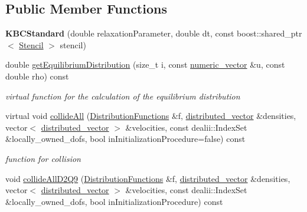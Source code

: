 \subsection*{Public Member Functions}
\begin{DoxyCompactItemize}
\item 
\hypertarget{classnatrium_1_1KBCStandard_ae775935dcbfcedc31364c5cb54031958}{
{\bfseries KBCStandard} (double relaxationParameter, double dt, const boost::shared\_\-ptr$<$ \hyperlink{classnatrium_1_1Stencil}{Stencil} $>$ stencil)}
\label{classnatrium_1_1KBCStandard_ae775935dcbfcedc31364c5cb54031958}

\item 
double \hyperlink{classnatrium_1_1KBCStandard_a1dac2deaafb93027bf168887dd2e002d}{getEquilibriumDistribution} (size\_\-t i, const \hyperlink{namespacenatrium_a67c39077adc6634f8fa3762b8eef24c4}{numeric\_\-vector} \&u, const double rho) const 
\begin{DoxyCompactList}\small\item\em virtual function for the calculation of the equilibrium distribution \item\end{DoxyCompactList}\item 
\hypertarget{classnatrium_1_1KBCStandard_ab27e055e44e1913a076235bc5a7f1f95}{
virtual void \hyperlink{classnatrium_1_1KBCStandard_ab27e055e44e1913a076235bc5a7f1f95}{collideAll} (\hyperlink{classnatrium_1_1DistributionFunctions}{DistributionFunctions} \&f, \hyperlink{namespacenatrium_a903d2b92917f582f2ff05f52160ab811}{distributed\_\-vector} \&densities, vector$<$ \hyperlink{namespacenatrium_a903d2b92917f582f2ff05f52160ab811}{distributed\_\-vector} $>$ \&velocities, const dealii::IndexSet \&locally\_\-owned\_\-dofs, bool inInitializationProcedure=false) const }
\label{classnatrium_1_1KBCStandard_ab27e055e44e1913a076235bc5a7f1f95}

\begin{DoxyCompactList}\small\item\em function for collision \item\end{DoxyCompactList}\item 
\hypertarget{classnatrium_1_1KBCStandard_a52be173f7289ef616099908c4ddb1316}{
void \hyperlink{classnatrium_1_1KBCStandard_a52be173f7289ef616099908c4ddb1316}{collideAllD2Q9} (\hyperlink{classnatrium_1_1DistributionFunctions}{DistributionFunctions} \&f, \hyperlink{namespacenatrium_a903d2b92917f582f2ff05f52160ab811}{distributed\_\-vector} \&densities, vector$<$ \hyperlink{namespacenatrium_a903d2b92917f582f2ff05f52160ab811}{distributed\_\-vector} $>$ \&velocities, const dealii::IndexSet \&locally\_\-owned\_\-dofs, bool inInitializationProcedure) const }
\label{classnatrium_1_1KBCStandard_a52be173f7289ef616099908c4ddb1316}


\end{DoxyCompactItemize}
